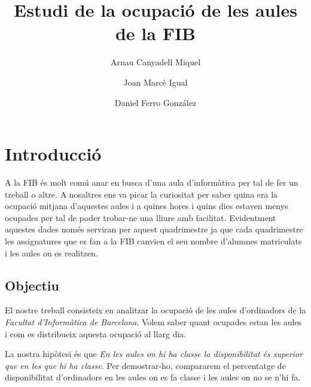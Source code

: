\documentclass[a4paper, 12pt]{article}
\begin{document}
\title{Estudi de la ocupació de les aules de la FIB}
\author{Arnau Canyadell Miquel \and Joan Marcè Igual \and Daniel Ferro González}

\maketitle
\newpage
\tableofcontents

\newpage
\section{Introducció}

A la FIB és molt comú anar en busca d'una aula d'informàtica per tal de fer un treball o altre. A nosaltres ens va picar la curiositat per saber quina era la ocupació mitjana d'aquestes aules i a quines hores i quins dies estaven menys ocupades per tal de poder trobar-ne una lliure amb facilitat. Evidentment aquestes dades només serviran per aquest quadrimestre ja que cada quadrimestre les assignatures que es fan a la FIB canvien el seu nombre d'alumnes matriculats i les aules on es realitzen.

\subsection{Objectiu}

El nostre treball consisteix en analitzar la ocupació de les aules d'ordinadors de la \emph{Facultat d'Informàtica de Barcelona}. Volem saber quant ocupades estan les aules i com es distribueix aquesta ocupació al llarg dia.

La nostra hipòtesi és que \emph{En les aules on hi ha classe la disponibilitat és superior que en les que hi ha classe}. Per demostrar-ho, compararem el percentatge de disponibilitat d'ordinadors en les aules on es fa classe i les aules on no se n'hi fa.






\end{document}
